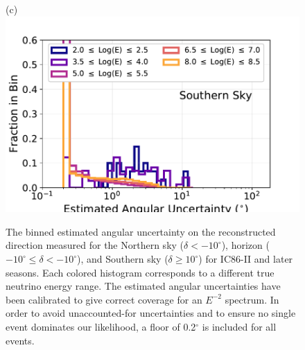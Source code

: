 \documentclass[aps,10pt,prd,twocolumn,floats,letterpaper,showpacs,nofootinbib,bibnotes,notitlepage,superscriptaddress,floatfix]{revtex4-1}
\begin{document}
\begin{figure}[t]
\begin{minipage}[c][3.5cm][c]{0.30\textwidth}
{(c)}\\\includegraphics[width=\linewidth]{./PublicReleasePlots/ReconstructionPlots/IC86-II/IC86_II_MC_angErr_0.pdf}
\end{minipage}
\caption{The binned estimated angular uncertainty on the  reconstructed direction measured for the Northern sky ($\delta<-10^\circ$), horizon ($-10^\circ\leq\delta<-10^\circ$), and Southern sky ($\delta\geq 10^\circ$) for IC86-II and later seasons. Each colored histogram corresponds to a different true neutrino energy range. The estimated angular uncertainties have been calibrated to give correct coverage for an $E^{-2}$ spectrum. In order to avoid unaccounted-for uncertainties and to ensure no single event dominates our likelihood, a floor of 0.2$^\circ$ is included for all events.}\label{fig:AngErr}
\end{figure}
\end{document}
